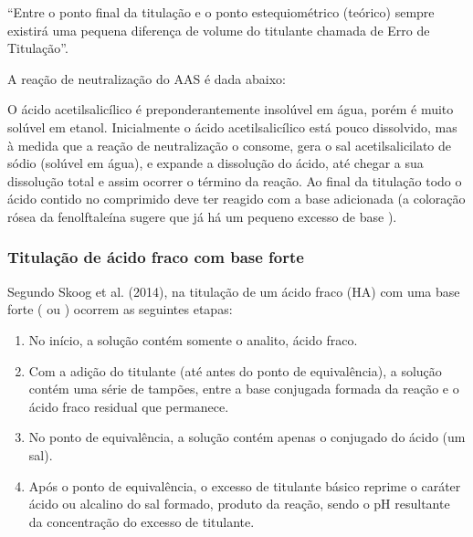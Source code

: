 “Entre o ponto final da titulação e o ponto estequiométrico (teórico) sempre existirá uma pequena
diferença de volume do titulante chamada de Erro de Titulação”.~\cite{Ruy1999}

A reação de neutralização do AAS é dada abaixo:

\begin{center}
\end{center} 

O ácido acetilsalicílico é preponderantemente insolúvel em água, porém é muito solúvel em etanol.
Inicialmente o ácido acetilsalicílico está pouco dissolvido, mas à  medida  que  a  reação  de
neutralização o consome, gera o  sal acetilsalicilato de  sódio (solúvel em água), e expande a
dissolução do ácido, até chegar a sua dissolução total e assim ocorrer o término da reação. Ao final
da titulação todo o ácido contido no comprimido deve ter reagido com a base adicionada (a coloração
rósea da fenolftaleína sugere que já há um pequeno excesso de base ).

\subsubsection{Titulação de ácido fraco com base forte}

Segundo Skoog et al. (2014), na titulação de um ácido fraco (HA) com uma base forte ( ou
) ocorrem as seguintes etapas:

\begin{enumerate}
    \item No início, a solução contém somente o analito, ácido fraco.
    \item Com a adição do titulante (até antes do ponto de equivalência), a solução contém uma série
        de tampões, entre a base conjugada formada da reação e o ácido fraco residual que permanece.
    \item No ponto de equivalência, a solução contém apenas o conjugado do ácido (um sal).
    \item Após o ponto de equivalência, o excesso de titulante básico reprime o caráter ácido ou
        alcalino do sal formado, produto da reação, sendo o pH resultante da concentração do excesso
        de titulante.
\end{enumerate}

